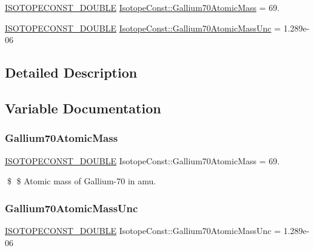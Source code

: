 \begin{DoxyCompactItemize}
\item 
\mbox{\hyperlink{group___isotope_const-_macros_ga8f45a7272ce02c0b4c65c44636ed719a}{I\+S\+O\+T\+O\+P\+E\+C\+O\+N\+S\+T\+\_\+\+D\+O\+U\+B\+LE}} \mbox{\hyperlink{group___isotope_const-_gallium-_ga70_ga035348c43f5f3622cabd1d7e698be44d}{Isotope\+Const\+::\+Gallium70\+Atomic\+Mass}} = 69.
\item 
\mbox{\hyperlink{group___isotope_const-_macros_ga8f45a7272ce02c0b4c65c44636ed719a}{I\+S\+O\+T\+O\+P\+E\+C\+O\+N\+S\+T\+\_\+\+D\+O\+U\+B\+LE}} \mbox{\hyperlink{group___isotope_const-_gallium-_ga70_gae757fbfc365a30511cc45ba3e7908cee}{Isotope\+Const\+::\+Gallium70\+Atomic\+Mass\+Unc}} = 1.\+289e-\/06
\end{DoxyCompactItemize}


\subsection{Detailed Description}


\subsection{Variable Documentation}
\mbox{\label{group___isotope_const-_gallium-_ga70_ga035348c43f5f3622cabd1d7e698be44d}} 
\subsubsection{\texorpdfstring{Gallium70\+Atomic\+Mass}{Gallium70AtomicMass}}
{\footnotesize\ttfamily \mbox{\hyperlink{group___isotope_const-_macros_ga8f45a7272ce02c0b4c65c44636ed719a}{I\+S\+O\+T\+O\+P\+E\+C\+O\+N\+S\+T\+\_\+\+D\+O\+U\+B\+LE}} Isotope\+Const\+::\+Gallium70\+Atomic\+Mass = 69.}

\$ \$ Atomic mass of Gallium-\/70 in amu. \mbox{\label{group___isotope_const-_gallium-_ga70_gae757fbfc365a30511cc45ba3e7908cee}} 
\subsubsection{\texorpdfstring{Gallium70\+Atomic\+Mass\+Unc}{Gallium70AtomicMassUnc}}
{\footnotesize\ttfamily \mbox{\hyperlink{group___isotope_const-_macros_ga8f45a7272ce02c0b4c65c44636ed719a}{I\+S\+O\+T\+O\+P\+E\+C\+O\+N\+S\+T\+\_\+\+D\+O\+U\+B\+LE}} Isotope\+Const\+::\+Gallium70\+Atomic\+Mass\+Unc = 1.\+289e-\/06}

